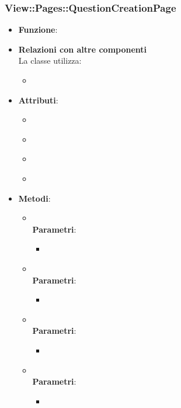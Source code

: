 \subsubsection{View::Pages::QuestionCreationPage}
\begin{itemize}
\item\textbf{Funzione}:
\item\textbf{Relazioni con altre componenti}\\
La classe utilizza:
	\begin{itemize}
		\item
	\end{itemize}
\item\textbf{Attributi}:
	\begin{itemize}
		\item\code{}\\
		\item\code{}\\
		\item\code{}\\
		\item\code{}\\
	\end{itemize}
\item\textbf{Metodi}:
	\begin{itemize}
		\item\code{}\\
		\textbf{Parametri}:
			\begin{itemize}
				\item\code{}\\
			\end{itemize}
		\item\code{}\\
		\textbf{Parametri}:
			\begin{itemize}
				\item\code{}\\
			\end{itemize}
		\item\code{}\\
		\textbf{Parametri}:
			\begin{itemize}
				\item\code{}\\
			\end{itemize}
		\item\code{}\\
		\textbf{Parametri}:
			\begin{itemize}
				\item\code{}\\
			\end{itemize}
	\end{itemize}
\end{itemize}

